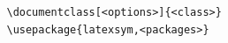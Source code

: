 \documentclass{article}
\begin{document}
\begin{verbatim}
   \documentclass[<options>]{<class>}
   \usepackage{latexsym,<packages>}
\end{verbatim}
\end{document}

